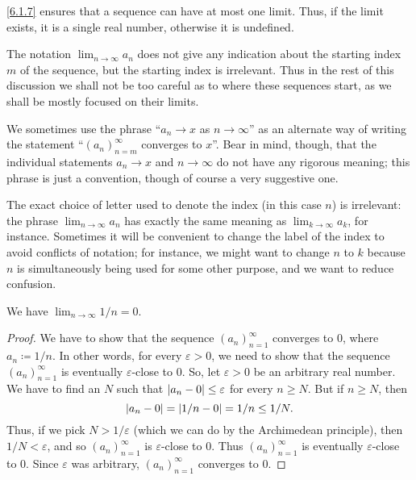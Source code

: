 \begin{note}
  \cref{6.1.7} ensures that a sequence can have at most one limit.
  Thus, if the limit exists, it is a single real number, otherwise it is undefined.
\end{note}

\begin{rmk}\label{6.1.9}
  The notation \(\lim_{n \to \infty} a_n\) does not give any indication about the starting index \(m\) of the sequence, but the starting index is irrelevant.
  Thus in the rest of this discussion we shall not be too careful as to where these sequences start, as we shall be mostly focused on their limits.
\end{rmk}

\begin{note}
  We sometimes use the phrase ``\(a_n \to x\) as \(n \to \infty\)'' as an alternate way of writing the statement ``\((a_n)_{n = m}^\infty\) converges to \(x\)''.
  Bear in mind, though, that the individual statements \(a_n \to x\) and \(n \to \infty\) do not have any rigorous meaning;
  this phrase is just a convention, though of course a very suggestive one.
\end{note}

\begin{rmk}\label{6.1.10}
  The exact choice of letter used to denote the index (in this case \(n\)) is irrelevant:
  the phrase \(\lim_{n \to \infty} a_n\) has exactly the same meaning as \(\lim_{k \to \infty} a_k\), for instance.
  Sometimes it will be convenient to change the label of the index to avoid conflicts of notation;
  for instance, we might want to change \(n\) to \(k\) because \(n\) is simultaneously being used for some other purpose, and we want to reduce confusion.
\end{rmk}

\begin{prop}\label{6.1.11}
  We have \(\lim_{n \to \infty} 1 / n = 0\).
\end{prop}

\begin{proof}
  We have to show that the sequence \((a_n)_{n = 1}^\infty\) converges to \(0\), where \(a_n \coloneqq 1 / n\).
  In other words, for every \(\varepsilon > 0\), we need to show that the sequence \((a_n)_{n = 1}^\infty\) is eventually \(\varepsilon\)-close to \(0\).
  So, let \(\varepsilon > 0\) be an arbitrary real number.
  We have to find an \(N\) such that \(\left\lvert a_n - 0\right\rvert \leq \varepsilon\) for every \(n \geq N\).
  But if \(n \geq N\), then
  \[
    \left\lvert a_n - 0\right\rvert = \left\lvert1 / n - 0\right\rvert = 1 / n \leq 1 / N.
  \]
  Thus, if we pick \(N > 1 / \varepsilon\) (which we can do by the Archimedean principle), then \(1 / N < \varepsilon\), and so \((a_n)_{n = 1}^\infty\) is \(\varepsilon\)-close to \(0\).
  Thus \((a_n)_{n = 1}^\infty\) is eventually \(\varepsilon\)-close to \(0\).
  Since \(\varepsilon\) was arbitrary, \((a_n)_{n = 1}^\infty\) converges to \(0\).
\end{proof}

